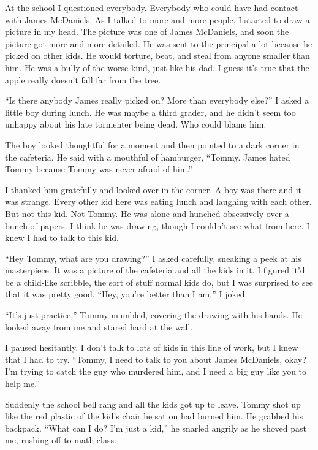 At the school I questioned everybody. Everybody who could have had
contact with James McDaniels. As I talked to more and more people,
I started to draw a picture in my head. The picture was one of
James McDaniels, and soon the picture got more and more detailed.
He was sent to the principal a lot because he picked on other kids.
He would torture, beat, and steal from anyone smaller than him. He
was a bully of the worse kind, just like his dad. I guess
it's true that the apple really doesn't fall far from
the tree.



``Is there anybody James really picked on? More than everybody
else?'' I asked a little boy during lunch. He was maybe a
third grader, and he didn't seem too unhappy about his late
tormenter being dead. Who could blame him.



The boy looked thoughtful for a moment and then pointed to a dark
corner in the cafeteria. He said with a mouthful of hamburger,
``Tommy. James hated Tommy because Tommy was never afraid of
him.''



I thanked him gratefully and looked over in the corner. A boy was
there and it was strange. Every other kid here was eating lunch and
laughing with each other. But not this kid. Not Tommy. He was alone
and hunched obsessively over a bunch of papers. I think he was
drawing, though I couldn't see what from here. I knew I had
to talk to this kid.



``Hey Tommy, what are you drawing?'' I asked carefully,
sneaking a peek at his masterpiece. It was a picture of the
cafeteria and all the kids in it. I figured it'd be a
child-like scribble, the sort of stuff normal kids do, but I was
surprised to see that it was pretty good. ``Hey, you're
better than I am,'' I joked.



``It's just practice,'' Tommy mumbled, covering the
drawing with his hands. He looked away from me and stared hard at
the wall.



I paused hesitantly. I don't talk to lots of kids in this
line of work, but I knew that I had to try. ``Tommy, I need to
talk to you about James McDaniels, okay? I'm trying to catch
the guy who murdered him, and I need a big guy like you to help
me.''



Suddenly the school bell rang and all the kids got up to leave.
Tommy shot up like the red plastic of the kid's chair he sat
on had burned him. He grabbed his backpack. ``What can I do?
I'm just a kid,'' he snarled angrily as he shoved past
me, rushing off to math class.



